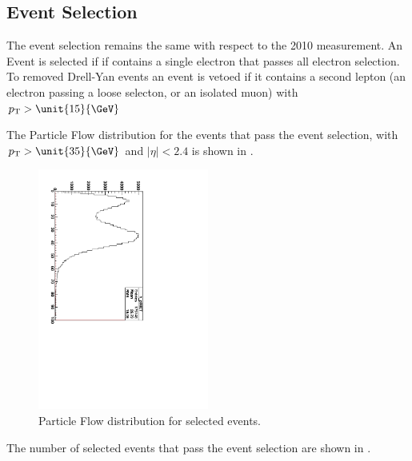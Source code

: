 \subsection{Event Selection}
The event selection remains the same with respect to the 2010 measurement.
An Event is selected if if contains a single electron that passes all electron
selection.
To removed Drell-Yan events an event is vetoed if it contains a second lepton
(an electron passing a loose selecton, or an isolated muon) with $\PT > 
\unit{15}{\GeV}$

The Particle Flow \ETm distribution for the events that pass the event
selection, with $\PT > \unit{35}{\GeV}$ and $|\eta| < 2.4$ is shown in
.

\begin{figure}[htbp]
  \centering
  \includegraphics[width=0.5\textwidth]{pfmet}
  \caption{Particle Flow \ETm distribution for selected events.}
  \label{asym840:pfmet}
\end{figure}

The number of selected events that pass the event selection are shown in
.

